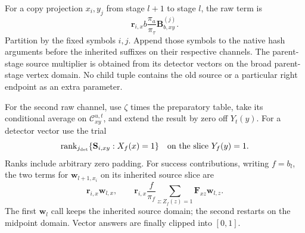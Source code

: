 \documentclass[11pt]{article}
\numberwithin{equation}{section}
\theoremstyle{definition}
\theoremstyle{remark}
\begin{document}
For a copy projection $x_i,y_j$ from stage $l+1$ to stage $l$, the raw term
is
\begin{equation}
 {\mathbf{r}}_{i,x}b\frac{\pi_a}{\pi_\tau}{\mathbf{B}}^{(j)}_{b,xy}.
 \label{eq:est-projection}
\end{equation}
Partition by the fixed symbols $i,j$.  Append those symbols to the native
hash arguments before the inherited suffixes on their respective channels.
The parent-stage source multiplier is obtained from its detector vectors
on the broad parent-stage vertex domain.  No child tuple contains the old
source or a particular right endpoint as an extra parameter.

For the second raw channel, use $\zeta$ times the preparatory table, take
its conditional average on $\mathcal C_{xy}^{u,t}$, and extend the result
by zero off $Y_t(y)$.  For a detector vector use the trial
\begin{equation}
 \operatorname{rank}_{{j_{\rm det}}}
       \{{\mathbf{S}}_{i,xy}:X_f(x)=1\}
 \quad\hbox{on the slice }Y_f(y)=1.
 \label{eq:est-detector}
\end{equation}
Ranks include arbitrary zero padding.  For success contributions, writing $f=b_l$, the
two terms for ${\mathbf{w}}_{l+1,x_i}$ on its inherited source slice are
\begin{equation}
 {\mathbf{r}}_{i,x}{\mathbf{w}}_{l,x},\qquad
 {\mathbf{r}}_{i,x}\frac f{\pi_f}
       \sum_{z:Z_f(z)=1}{\mathbf{F}}_{xz}{\mathbf{w}}_{l,z}.
 \label{eq:est-reward}
\end{equation}
The first ${\mathbf{w}}_l$ call keeps the inherited source domain; the second restarts
on the midpoint domain.  Vector answers are finally clipped into $[0,1]$.
\end{document}
